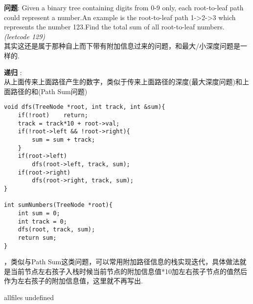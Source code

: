 \documentclass{article}
\begin{document}
\begin{CJK}{UTF8}{gbsn}     %

\else
    
\begin{description}
    \item{\textbf{问题}}: Given a binary tree containing digits from 0-9 only, each root-to-leaf path could represent a number.An example is the root-to-leaf path 1->2->3 which represents the number 123.Find the total sum of all root-to-leaf numbers. \textit{(leetcode 129)}
    \\其实这还是属于那种自上而下带有附加信息过来的问题，和最大/小深度问题是一样的.
    \item{\textbf{递归}} : 
    \\从上面传来上面路径产生的数字，类似于传来上面路径的深度(最大深度问题)和上面路径的和(Path Sum问题)
    \begin{lstlisting}
void dfs(TreeNode *root, int track, int &sum){
    if(!root)    return;
    track = track*10 + root->val;
    if(!root->left && !root->right){
        sum = sum + track;
    }
    if(root->left)
        dfs(root->left, track, sum);
    if(root->right)
        dfs(root->right, track, sum);
}

int sumNumbers(TreeNode *root){
    int sum = 0;
    int track = 0;
    dfs(root, track, sum);
    return sum;
}
    \end{lstlisting}
    ，类似与Path Sum这类问题，可以常用附加路径信息的栈实现迭代，具体做法就是当前节点左右孩子入栈时候当前节点的附加信息值*10加左右孩子节点的值然后作为左右孩子的附加信息值，这里就不再写出.
\end{description}

\fi

\ifx allfiles undefined
\end{CJK}
\end{document}

